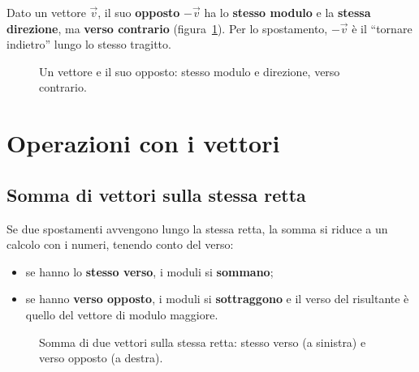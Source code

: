 Dato un vettore $\vec{v}$, il suo \textbf{opposto} $-\vec{v}$ ha lo \textbf{stesso modulo} e la \textbf{stessa direzione}, ma \textbf{verso contrario} (figura~\ref{fig:opposto}). Per lo spostamento, $-\vec{v}$ è il ``tornare indietro'' lungo lo stesso tragitto.

\begin{figure}[h!]
\centering
{}
\caption{Un vettore e il suo opposto: stesso modulo e direzione, verso contrario.}
\label{fig:opposto}
\end{figure}

\section{Operazioni con i vettori}\label{sec:operazioni-vettori}

\subsection{Somma di vettori sulla stessa retta}
Se due spostamenti avvengono lungo la stessa retta, la somma si riduce a un calcolo con i numeri, tenendo conto del verso:
\begin{itemize}
\item se hanno lo \textbf{stesso verso}, i moduli si \textbf{sommano};
\item se hanno \textbf{verso opposto}, i moduli si \textbf{sottraggono} e il verso del risultante è quello del vettore di modulo maggiore.
\end{itemize}

\begin{figure}[h!]
\centering
{}
\caption{Somma di due vettori sulla stessa retta: stesso verso (a sinistra) e verso opposto (a destra).}
\label{fig:sommaretta}
\end{figure}

